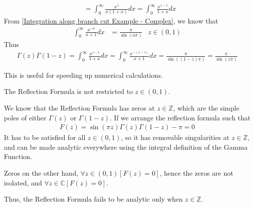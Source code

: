 \documentclass[12pt, english]{book}
\makeatletter
\renewenvironment{proof}[1][\proofname]{\par
	\pushQED{\qed}%
	\normalfont \topsep6\p@\@plus6\p@\relax
	\list{}{%
		\settowidth{\leftmargin}{\itshape\proofname:\hskip\labelsep}%
		\setlength{\labelwidth}{0pt}%
		\setlength{\itemindent}{-\leftmargin}%
	}%
	\item[\hskip\labelsep\itshape#1\@addpunct{:}]\ignorespaces
	}{ \popQED\endlist\@endpefalse}
\makeatother
\begin{document}
\begin{proof}
\begin{align*}
			&= \int_{0}^{\infty} \frac{x^z}{x(1+x)} dx
			 = \int_{0}^{\infty} \frac{x^{z-1}}{1+x} dx
		\end{align*}
		From \cref{Integration along branch cut Example - Complex}, we know that 
		\begin{align*}
			\int_{0}^{\infty} \frac{x^{-a}}{x+1} dx &= \frac{\pi}{\sin(a\pi)}
				& z \in (0,1)
		\end{align*}
		Thus 
		\begin{align*}
			\Gamma(z) \Gamma(1-z) 
			= \int_{0}^{\infty} \frac{x^{z-1}}{1+x} dx
			= \int_{0}^{\infty} \frac{x^{-(1-z)}}{x+1} dx 
			= \frac{\pi}{\sin((1-z)\pi)} 
			= \frac{\pi}{\sin(z\pi)}
		\end{align*}
	\end{proof}
	
	This is useful for speeding up numerical calculations.
	
	\begin{lemma}
		The Reflection Formula is not restricted to \(z \in (0, 1)\).
	\end{lemma}
	\begin{proof}
		We know that the Reflection Formula has zeros at \(z \in \mathbb{Z}\), which are the simple poles of either \(\Gamma(z)\) or \(\Gamma(1-z)\). If we arrange the reflection formula such that 
		\begin{align*}
			F(z) = \sin(\pi z) \Gamma(z) \Gamma(1-z) - \pi = 0
		\end{align*}
		It has to be satisfied for all \(z \in (0,1)\), so it has removable singularities at \(z \in \mathbb{Z}\), and can be made analytic everywhere using the integral definition of the Gamma Function.
		
		Zeros on the other hand, \(\forall z \in (0, 1)[F(z) = 0]\), hence the zeros are not isolated, and \(\forall z \in \mathbb{C}[F(z) = 0]\).
		
		Thus, the Reflection Formula fails to be analytic only when \(z \in \mathbb{Z}\).
	\end{proof}
	
\end{document}
